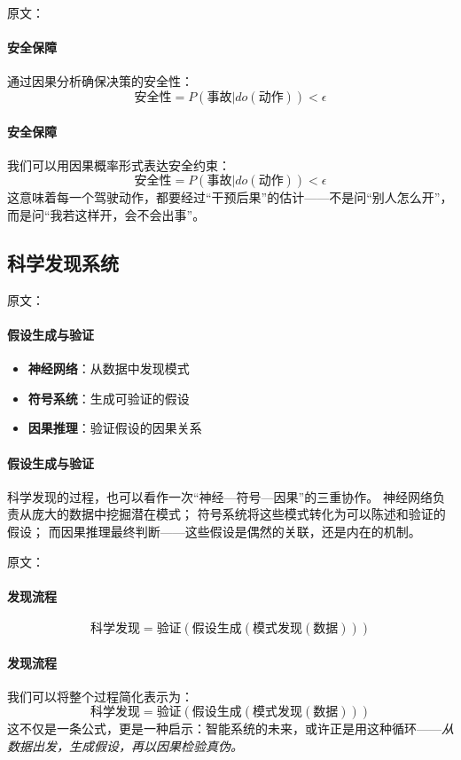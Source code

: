 原文：
\paragraph{安全保障}
通过因果分析确保决策的安全性：
$$\text{安全性} = P(\text{事故}|do(\text{动作})) < \epsilon$$
\paragraph{安全保障}
我们可以用因果概率形式表达安全约束：  
$$\text{安全性} = P(\text{事故}|do(\text{动作})) < \epsilon$$
这意味着每一个驾驶动作，都要经过“干预后果”的估计——不是问“别人怎么开”，而是问“我若这样开，会不会出事”。



\subsection{科学发现系统}

原文：
\paragraph{假设生成与验证}
\begin{itemize}
\item \textbf{神经网络}：从数据中发现模式
\item \textbf{符号系统}：生成可验证的假设
\item \textbf{因果推理}：验证假设的因果关系
\end{itemize}
\paragraph{假设生成与验证}
科学发现的过程，也可以看作一次“神经—符号—因果”的三重协作。  
神经网络负责从庞大的数据中挖掘潜在模式；  
符号系统将这些模式转化为可以陈述和验证的假设；  
而因果推理最终判断——这些假设是偶然的关联，还是内在的机制。

原文：
\paragraph{发现流程}
$$\text{科学发现} = \text{验证}(\text{假设生成}(\text{模式发现}(\text{数据})))$$
\paragraph{发现流程}
我们可以将整个过程简化表示为：  
$$\text{科学发现} = \text{验证}(\text{假设生成}(\text{模式发现}(\text{数据})))$$
这不仅是一条公式，更是一种启示：智能系统的未来，或许正是用这种循环——\emph{从数据出发，生成假设，再以因果检验真伪。}




